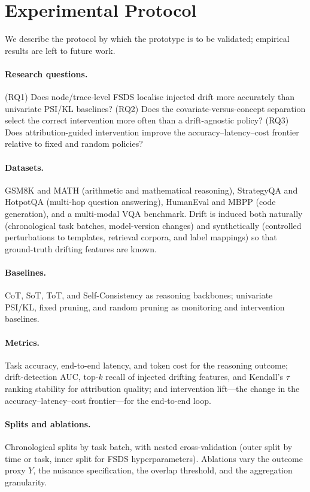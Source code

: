\documentclass[11pt]{article}
\begin{document}
\section{Experimental Protocol}
\label{sec:protocol}

We describe the protocol by which the prototype is to be validated; empirical
results are left to future work.

\paragraph{Research questions.} (RQ1) Does node/trace-level FSDS localise
injected drift more accurately than univariate PSI/KL baselines? (RQ2) Does the
covariate-versus-concept separation select the correct intervention more often
than a drift-agnostic policy? (RQ3) Does attribution-guided intervention improve
the accuracy--latency--cost frontier relative to fixed and random policies?

\paragraph{Datasets.} GSM8K and MATH (arithmetic and mathematical reasoning),
StrategyQA and HotpotQA (multi-hop question answering), HumanEval and MBPP (code
generation), and a multi-modal VQA benchmark. Drift is induced both naturally
(chronological task batches, model-version changes) and synthetically
(controlled perturbations to templates, retrieval corpora, and label mappings)
so that ground-truth drifting features are known.

\paragraph{Baselines.} CoT, SoT, ToT, and Self-Consistency as reasoning
backbones; univariate PSI/KL, fixed pruning, and random pruning as monitoring and
intervention baselines.

\paragraph{Metrics.} Task accuracy, end-to-end latency, and token cost for the
reasoning outcome; drift-detection AUC, top-$k$ recall of injected drifting
features, and Kendall's $\tau$ ranking stability for attribution quality; and
intervention lift---the change in the accuracy--latency--cost frontier---for the
end-to-end loop.

\paragraph{Splits and ablations.} Chronological splits by task batch, with nested
cross-validation (outer split by time or task, inner split for FSDS
hyperparameters). Ablations vary the outcome proxy $Y$, the nuisance
specification, the overlap threshold, and the aggregation granularity.
\end{document}
